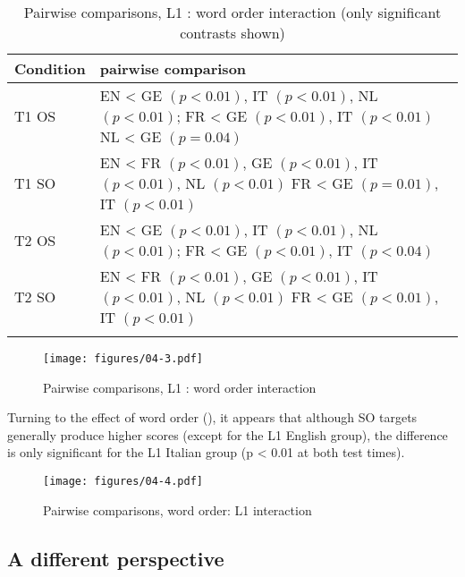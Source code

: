 \begin{table}
    \begin{tabularx}{\textwidth}{lQ}
    \lsptoprule
    Condition & pairwise comparison\\
    \midrule
    T1 OS & EN < GE $(p < 0.01)$, IT $(p < 0.01)$, NL $(p < 0.01)$;\newline
    FR < GE $(p < 0.01)$, IT $(p < 0.01)$\newline
    NL < GE $(p = 0.04)$\\
    \tablevspace
    T1 SO & EN < FR $(p < 0.01)$, GE $(p < 0.01)$, IT $(p < 0.01)$, NL $(p < 0.01)$\newline
    FR < GE $(p = 0.01)$, IT $(p < 0.01)$\\
    \tablevspace
    T2 OS & EN < GE $(p < 0.01)$, IT $(p < 0.01)$, NL $(p < 0.01)$;\newline
    FR < GE $(p < 0.01)$, IT $(p < 0.04)$\\
    \tablevspace
    T2 SO & EN < FR $(p < 0.01)$, GE $(p < 0.01)$, IT $(p < 0.01)$, NL $(p < 0.01)$\newline
    FR < GE $(p < 0.01)$, IT $(p < 0.01)$\\
    \lspbottomrule
    \end{tabularx}
    \caption{Pairwise comparisons, L1 : word order interaction (only significant contrasts shown)}
    \label{tab:04:5}
\end{table}

\begin{figure}[p]
    \texttt{[image: figures/04-3.pdf]}
    \caption{Pairwise comparisons, L1 : word order interaction}
    \label{fig:04:3}
\end{figure}

Turning to the effect of word order (), it appears that although SO targets generally produce higher scores (except for the L1 English group), the difference is only significant for the L1 Italian group (p < 0.01 at both test times).

\begin{figure}[p]
    \texttt{[image: figures/04-4.pdf]}
    \caption{Pairwise comparisons, word order: L1 interaction}
    \label{fig:04:4}
\end{figure}

\clearpage
\subsection{A different perspective}\label{sec:04:2.4}


